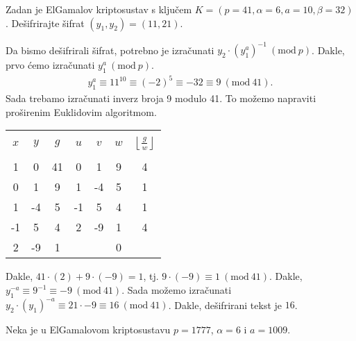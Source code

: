 \documentclass{exam}
\newcommand{\Mod}[1]{\ (\mathrm{mod}\ #1)}
\begin{document}
\begin{questions}
\question Zadan je ElGamalov kriptosustav s ključem $K = (p = 41, \alpha = 6, a = 10, \beta = 32)$. Dešifrirajte šifrat $(y_1, y_2) = (11, 21)$.

\begin{solution}
  Da bismo dešifrirali šifrat, potrebno je izračunati $y_2 \cdot (y_1^a)^{-1} \Mod{p}$. Dakle, prvo ćemo izračunati $y_1^{a} \Mod{p}$.
  \begin{align*}
    y_1^{a} \equiv 11^{10} \equiv (-2)^5 \equiv -32 \equiv 9 \Mod{41}.
  \end{align*}
  Sada trebamo izračunati inverz broja 9 modulo 41. To možemo napraviti proširenim Euklidovim algoritmom.

  \begin{tabular}{|c|c|c|c|c|c|c|}
    \hline
    & & & & & &\\[-1em]
    $x$ & $y$ & $g$ & $u$ & $v$ & $w$ & $\left\lfloor \frac{g}{w} \right\rfloor$\\
    & & & & & &\\[-1em]
    \hline
    1 & 0 & 41 & 0 & 1 & 9 & 4\\
    0 & 1 & 9 & 1 & -4 & 5 & 1\\
    1 & -4 & 5 & -1 & 5 & 4 & 1\\
    -1 & 5 & 4 & 2 & -9 & 1 & 4\\
    2 & -9 & 1 & & & 0 &\\
    \hline
  \end{tabular}

  Dakle, $41 \cdot (2) + 9 \cdot (-9) = 1$, tj. $9 \cdot (-9) \equiv 1 \Mod{41}$. Dakle, $y_1^{-a} \equiv 9^{-1} \equiv -9 \Mod{41}$. Sada možemo izračunati $y_2 \cdot (y_1)^{-a} \equiv 21 \cdot -9 \equiv 16 \Mod{41}$. Dakle, dešifrirani tekst je $16$.
\end{solution}

\question Neka je u ElGamalovom kriptosustavu $p = 1777$, $\alpha = 6$ i $a = 1009$.

\begin{solution}
  \begin{parts}

\end{parts}
\end{solution}
\end{questions}
\end{document}
